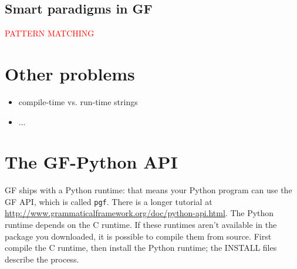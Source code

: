 \documentclass{scrartcl}
\newcommand{\note}[1]{\textcolor{red}{\uppercase{#1}}}
\begin{document}
\subsection{Smart paradigms in GF}

\note{pattern matching}


\section{Other problems}
\begin{itemize}
\item compile-time vs. run-time strings
\item ...
\end{itemize}
\section{The GF-Python API}

GF ships with a Python runtime: that means your Python program can use the GF API, which is called \texttt{pgf}. There is a longer tutorial at \url{http://www.grammaticalframework.org/doc/python-api.html}. The Python runtime depends on the C runtime. If these runtimes aren't available in the package you downloaded, it is possible to compile them from source. First compile the C runtime, then install the Python runtime; the INSTALL files describe the process.
\end{document}
